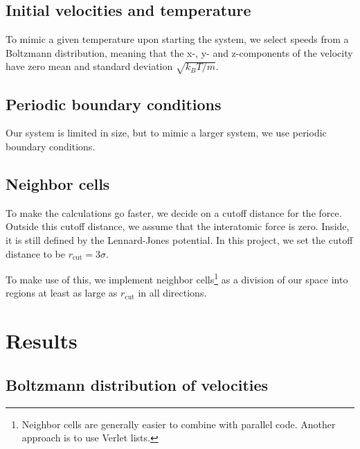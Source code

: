 \documentclass[reprint,floatfix,amsmath,amssymb,aps,pra]{revtex4-1}
\begin{document}
\subsection{Initial velocities and temperature}

To mimic a given temperature upon starting the system, we select speeds from a Boltzmann distribution, meaning that the x-, y- and z-components of the velocity have zero mean and standard deviation $\sqrt{k_{B}T / m}$.

\subsection{Periodic boundary conditions}

Our system is limited in size, but to mimic a larger system, we use periodic boundary conditions. 

\subsection{Neighbor cells}

To make the calculations go faster, we decide on a cutoff distance for the force. Outside this cutoff distance, we assume that the interatomic force is zero. Inside, it is still defined by the Lennard-Jones potential. In this project, we set the cutoff distance to be $r_{\text{cut}} = 3 \sigma$.

To make use of this, we implement neighbor cells\footnote{Neighbor cells are generally easier to combine with parallel code. Another approach is to use Verlet lists.} as a division of our space into regions at least as large as $r_{\text{cut}}$ in all directions.

\section{Results}

\subsection{Boltzmann distribution of velocities}
\end{document}
